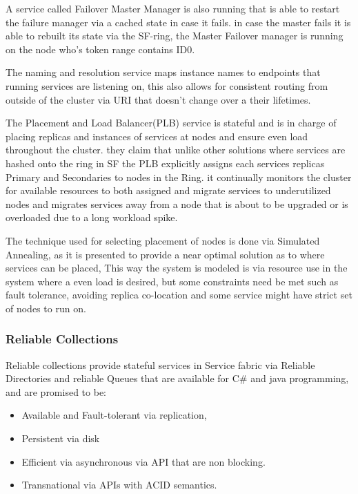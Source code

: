 \documentclass[a4paper,10pt,titlepage]{report}
\begin{document}
    A service called Failover Master Manager is also running that is able to restart the failure manager via a cached state in case it fails. in case the master fails it is able to rebuilt its state via the SF-ring, the Master Failover manager is running on the node who's token range contains ID0.\\
    \vspace{5mm}

    The naming and resolution service maps instance names to endpoints that running services are listening on, this also allows for consistent routing from outside of the cluster via URI that doesn't change over a their lifetimes.\\
    \vspace{5mm}

    The Placement and Load Balancer(PLB) service is stateful and is in charge of placing replicas and instances of services at nodes and ensure even load throughout the cluster. they claim that unlike other solutions where services are hashed onto the ring in SF the PLB explicitly assigns each services replicas Primary and Secondaries to nodes in the Ring. it continually monitors the cluster for available resources to both assigned and migrate services to underutilized nodes and migrates services away from a node that is about to be upgraded or is overloaded due to a long workload spike.\\
    \vspace{5mm}

    The technique used for selecting placement of nodes is done via Simulated Annealing, as it is presented to provide a near optimal solution as to where services can be placed, This way the system is modeled is via resource use in the system where a even load is desired, but some constraints need be met such as fault tolerance, avoiding replica co-location and some service might have strict set of nodes to run on. \\
    \vspace{5mm}

    \subsubsection{Reliable Collections}

    Reliable collections provide stateful services in Service fabric via Reliable Directories and reliable Queues that are available for C\# and java programming, and are promised to be:
    \begin{itemize}
        \item Available and Fault-tolerant via replication,
        \item Persistent via disk
        \item Efficient via asynchronous via API that are non blocking.
        \item Transnational via APIs with ACID semantics.
    \end{itemize}
\end{document}
